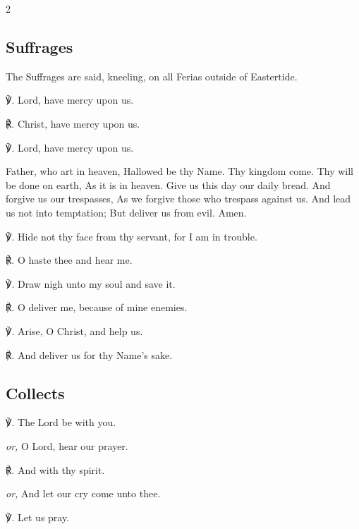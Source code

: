 \begin{multicols}{2}
\newcolumn

\subsection{Suffrages}


\begin{rubric}
	The Suffrages are said, kneeling, on all Ferias outside of Eastertide.
\end{rubric}

℣. Lord, have mercy upon us.

℟. Christ, have mercy upon us.

℣. Lord, have mercy upon us.

 Father, who art in heaven, Hallowed be thy Name. Thy kingdom come. Thy will be done on earth, As it is in heaven. Give us this day our daily bread. And forgive us our trespasses, As we forgive those who trespass against us. And lead us not into temptation; But deliver us from evil. Amen.

℣. Hide not thy face from thy servant, for I am in trouble.

℟. O haste thee and hear me.

℣. Draw nigh unto my soul and save it.

℟. O deliver me, because of mine enemies.

℣. Arise, O Christ, and help us.

℟. And deliver us for thy Name's sake.


\newcolumn

\subsection{Collects}


℣. The Lord be with you.\par
\textit{or,} O Lord, hear our prayer.

℟. And with thy spirit.\par
\textit{or,} And let our cry come unto thee.

℣. Let us pray.


\end{multicols}

